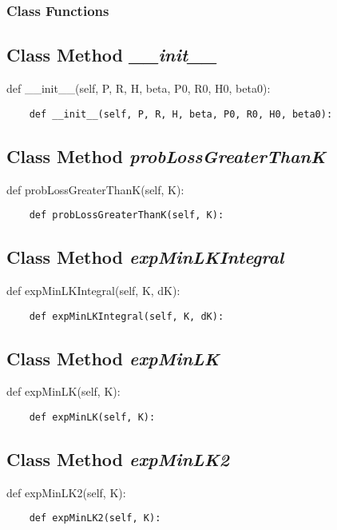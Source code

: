 \documentclass[twoside,11pt]{book}
\begin{document}
\subsubsection{Class Functions}

\subsection{Class Method {\it \_\_init\_\_}}
def \_\_init\_\_(self, P, R, H, beta, P0, R0, H0, beta0):

\begin{lstlisting}
    def __init__(self, P, R, H, beta, P0, R0, H0, beta0):
\end{lstlisting}

\subsection{Class Method {\it probLossGreaterThanK}}
def probLossGreaterThanK(self, K):

\begin{lstlisting}
    def probLossGreaterThanK(self, K):
\end{lstlisting}

\subsection{Class Method {\it expMinLKIntegral}}
def expMinLKIntegral(self, K, dK):

\begin{lstlisting}
    def expMinLKIntegral(self, K, dK):
\end{lstlisting}

\subsection{Class Method {\it expMinLK}}
def expMinLK(self, K):

\begin{lstlisting}
    def expMinLK(self, K):
\end{lstlisting}

\subsection{Class Method {\it expMinLK2}}
def expMinLK2(self, K):

\begin{lstlisting}
    def expMinLK2(self, K):
\end{lstlisting}
\end{document}
